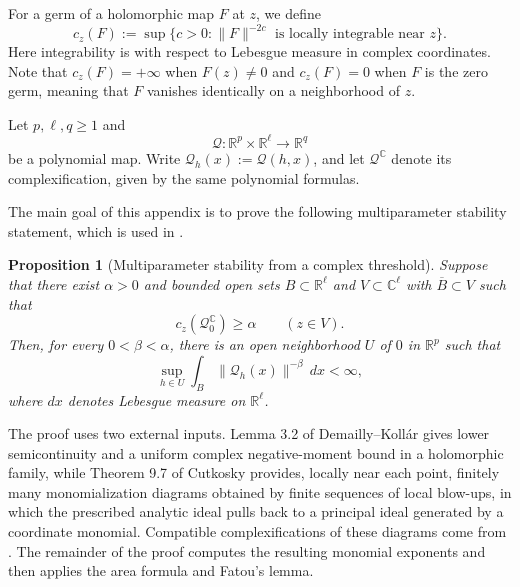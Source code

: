 \documentclass[reqno,11pt]{amsart}
\numberwithin{equation}{section}
\newtheorem{proposition}[theorem]{Proposition}
\theoremstyle{definition}
\theoremstyle{remark}
\begin{document}
For a germ of a holomorphic map $F$ at $z$, we define
$$
 c_z(F):=\sup\{c>0:\|F\|^{-2c}\text{ is locally integrable near }z\}.
$$
Here integrability is with respect to Lebesgue measure in complex
coordinates. Note that $c_z(F)=+\infty$ when $F(z)\ne0$ and $c_z(F)=0$ when $F$ is the zero
germ, meaning that $F$ vanishes identically on a neighborhood of $z$.

Let
$p,\ell,q\ge1$ and 
$$
\mathcal Q:\mathbb R^p\times\mathbb R^\ell\to\mathbb R^q
$$
be a polynomial map. Write $\mathcal Q_h(x):=\mathcal Q(h,x)$, and let
$\mathcal Q^{\mathbb C}$ denote its complexification, given by the same
polynomial formulas. 

The main goal of this appendix is to prove the following multiparameter
stability statement, which is used in
.

\begin{proposition}[Multiparameter stability from a complex threshold]
\label{prop:multiparameter-stability}
Suppose that there exist $\alpha>0$ and bounded open sets
$B\subset\mathbb R^\ell$ and $V\subset\mathbb C^\ell$ with
$\overline B\subset V$ such that
$$
c_z(\mathcal Q_0^{\mathbb C})\ge\alpha
\qquad(z\in V).
$$
Then, for every $0<\beta<\alpha$, there is an open neighborhood $U$ of $0$
in $\mathbb R^p$ such that
$$
\sup_{h\in U}\int_B\|\mathcal Q_h(x)\|^{-\beta}\,dx<\infty,
$$
where $dx$ denotes Lebesgue measure on $\mathbb R^\ell$.
\end{proposition}

The proof uses two external inputs. Lemma 3.2 of Demailly--Koll\'ar
\cite{DemaillyKollar2001} gives lower semicontinuity and a uniform
complex negative-moment bound in a holomorphic family, while
Theorem 9.7 of Cutkosky \cite{Cutkosky2017} provides, locally near each
point, finitely many monomialization diagrams obtained by finite sequences
of local blow-ups, in which the prescribed analytic ideal pulls back to a
principal ideal generated by a coordinate monomial. Compatible complexifications of these
diagrams come from \cite[Proposition~9.6 and the proof of
Theorem~9.7]{Cutkosky2017}. The
remainder of the proof computes the resulting monomial exponents and then
applies the area formula and Fatou's lemma.
\end{document}
